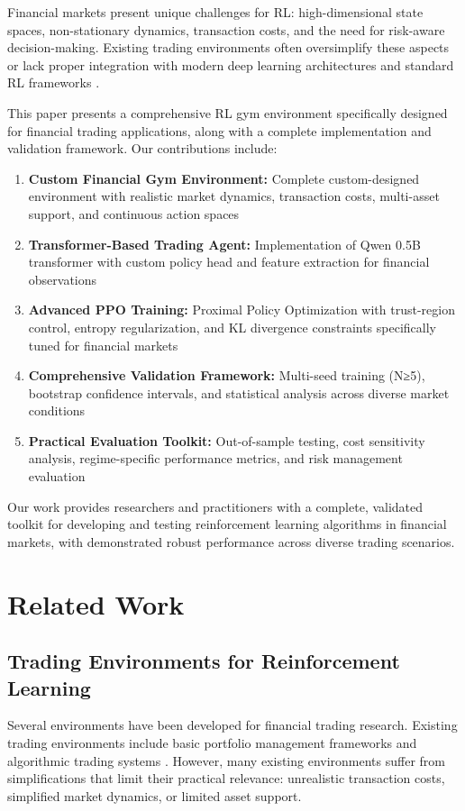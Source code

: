 \documentclass[10pt,journal]{IEEEtran}
\begin{document}
Financial markets present unique challenges for RL: high-dimensional state spaces, non-stationary dynamics, transaction costs, and the need for risk-aware decision-making. Existing trading environments often oversimplify these aspects or lack proper integration with modern deep learning architectures and standard RL frameworks \cite{ref3,ref4}.

This paper presents a comprehensive RL gym environment specifically designed for financial trading applications, along with a complete implementation and validation framework. Our contributions include:

\begin{enumerate}
\item \textbf{Custom Financial Gym Environment:} Complete custom-designed environment with realistic market dynamics, transaction costs, multi-asset support, and continuous action spaces
\item \textbf{Transformer-Based Trading Agent:} Implementation of Qwen 0.5B transformer with custom policy head and feature extraction for financial observations
\item \textbf{Advanced PPO Training:} Proximal Policy Optimization with trust-region control, entropy regularization, and KL divergence constraints specifically tuned for financial markets
\item \textbf{Comprehensive Validation Framework:} Multi-seed training (N≥5), bootstrap confidence intervals, and statistical analysis across diverse market conditions
\item \textbf{Practical Evaluation Toolkit:} Out-of-sample testing, cost sensitivity analysis, regime-specific performance metrics, and risk management evaluation
\end{enumerate}

Our work provides researchers and practitioners with a complete, validated toolkit for developing and testing reinforcement learning algorithms in financial markets, with demonstrated robust performance across diverse trading scenarios.

\section{Related Work}

\subsection{Trading Environments for Reinforcement Learning}
Several environments have been developed for financial trading research. Existing trading environments include basic portfolio management frameworks \cite{ref3} and algorithmic trading systems \cite{ref4}. However, many existing environments suffer from simplifications that limit their practical relevance: unrealistic transaction costs, simplified market dynamics, or limited asset support.
\end{document}
